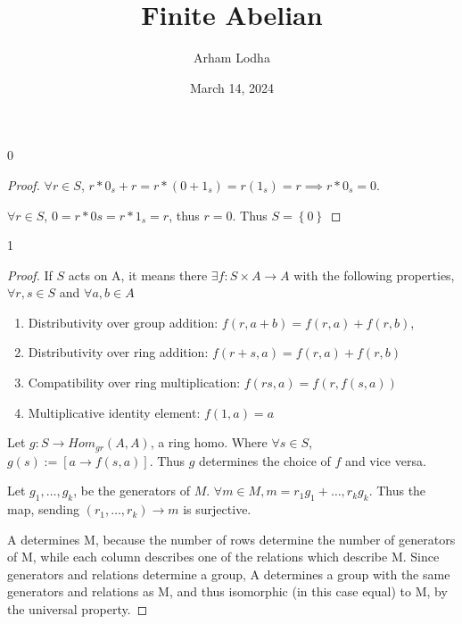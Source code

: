 \documentclass{article}
\begin{document}
\title{Finite Abelian}
\author{Arham Lodha}%
\date{March 14, 2024}%
\maketitle

\begin{PROB}{0}\label{Problem 0.}
\end{PROB}
\begin{proof}

    $\forall r \in S$, $r * 0_s + r = r * (0 + 1_s) = r(1_s) = r \implies r*0_s = 0$.   

    $\forall r \in S$, $0 = r * 0s = r * 1_{s} = r$, thus $r = 0$. Thus $S = \left\{ 0 \right\}$   
\end{proof}

\bigskip

\begin{PROB}{1}\label{Problem 1.}
    
\end{PROB}
\begin{proof}
    If $S$ acts on A, it means there $\exists f: S \times A \to A$ with the following properties, $\forall r, s \in S$ and $\forall a, b \in A$   
    
    \begin{enumerate}
        \item Distributivity over group addition: $f(r, a + b)  = f(r, a) + f(r, b)$,
        \item Distributivity over ring addition: $f(r + s, a) = f(r, a) + f(r, b)$
        \item Compatibility over ring multiplication: $f(rs, a) = f(r, f(s, a))$
        \item Multiplicative identity element: $f(1, a) = a$
    \end{enumerate}

    Let $g: S \to Hom_{gr}(A, A)$, a ring homo. Where $\forall s \in S$, $g(s) := [a \to f(s, a)]$. Thus $g$ determines the choice of $f$ and vice versa.      


    Let $g_1, \dots, g_k$, be the generators of $M$. $\forall m \in M, m = r_1g_1 + \dots, r_kg_k$. Thus the map, sending $\left(r_1, \dots, r_k\right)\to m$ is surjective.
    
    A determines M, because the number of rows determine the number of generators of M, while each column describes one of the relations which describe M. Since generators and relations determine a group, A determines a group with the same generators and relations as M, and thus isomorphic (in this case equal) to M, by the universal property.
\end{proof}
\end{document}
